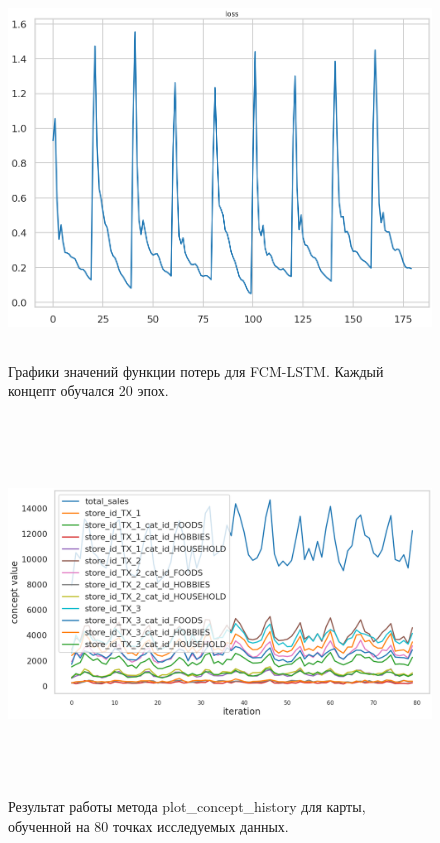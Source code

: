 \def\figurename{Рис}
\begin{figure}[h]
	\centering
	\includegraphics[height=10cm]{./img/fcm_losses.png}
	\caption{Графики значений функции потерь для FCM-LSTM. Каждый концепт обучался 20 эпох.}
	\label{img:fcm_losses}
\end{figure}

\begin{figure}[h]
	\centering
	\includegraphics[height=10cm]{./img/plot_concept_history.png}
	\caption{Результат работы метода plot\_concept\_history для карты, обученной на 80 точках исследуемых данных.}
	\label{img:plot_concept_history}
\end{figure}